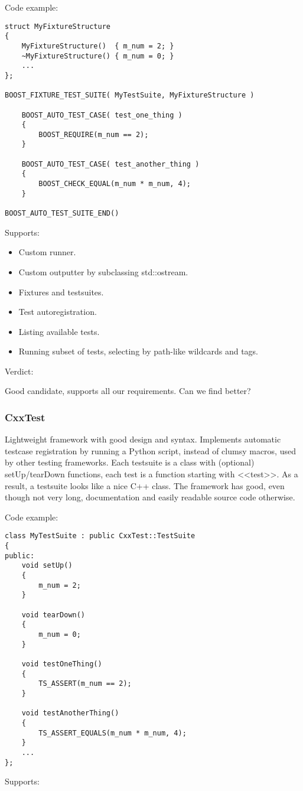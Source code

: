 \documentclass[10pt, a5paper]{article}
\begin{document}
Code example:

\begin{verbatim}
struct MyFixtureStructure
{
    MyFixtureStructure()  { m_num = 2; }
    ~MyFixtureStructure() { m_num = 0; }
    ...
};

BOOST_FIXTURE_TEST_SUITE( MyTestSuite, MyFixtureStructure )

    BOOST_AUTO_TEST_CASE( test_one_thing )
    {
        BOOST_REQUIRE(m_num == 2);
    }

    BOOST_AUTO_TEST_CASE( test_another_thing )
    {
        BOOST_CHECK_EQUAL(m_num * m_num, 4);
    }

BOOST_AUTO_TEST_SUITE_END()

\end{verbatim}
Supports:

\begin{itemize}
  \item Custom runner.
  \item Custom outputter by subclassing std::ostream.
  \item Fixtures and testsuites.
  \item Test autoregistration.
  \item Listing available tests.
  \item Running subset of tests, selecting by path-like wildcards and tags.
\end{itemize}

Verdict:

Good candidate, supports all our requirements. Can we find better?

\subsubsection*{CxxTest}

Lightweight framework with good design and syntax. Implements automatic testcase registration by running a Python script, instead of clumsy macros, used by other testing frameworks. Each testsuite is a class with (optional) setUp/tearDown functions, each test is a function starting with <<test>>. As a result, a testsuite looks like a nice C++ class. The framework has good, even though not very long, documentation and easily readable source code otherwise.

Code example:

\begin{verbatim}
class MyTestSuite : public CxxTest::TestSuite
{
public:
    void setUp()
    {
        m_num = 2;
    }

    void tearDown()
    {
        m_num = 0;
    }

    void testOneThing()
    {
        TS_ASSERT(m_num == 2);
    }

    void testAnotherThing()
    {
        TS_ASSERT_EQUALS(m_num * m_num, 4);
    }
    ...
};
\end{verbatim}
Supports:
\end{document}
